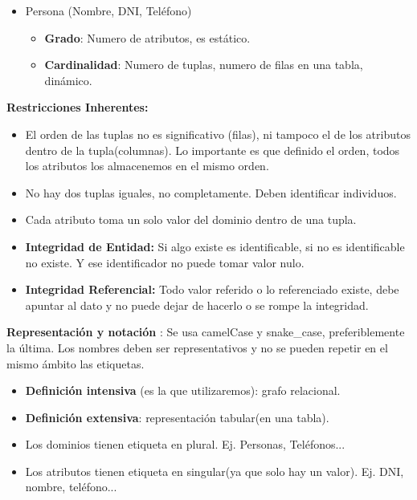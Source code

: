 \documentclass[12pt, twoside, openright]{report} %
\begin{document}
  \begin{itemize}
  \item Persona (Nombre, DNI, Teléfono)
    

    \begin{itemize}
    \item \textbf{Grado}: Numero de atributos, es estático.
      
    \item \textbf{Cardinalidad}: Numero de tuplas, numero de filas en una
      tabla, dinámico.
      
    \end{itemize}
  \end{itemize}

  
  \textbf{Restricciones Inherentes:}
  

  \begin{itemize}
  \item El orden de las tuplas no es significativo (filas), ni tampoco el de
    los atributos dentro de la tupla(columnas). Lo importante es que
    definido el orden, todos los atributos los almacenemos en el mismo
    orden.
    
  \item No hay dos tuplas iguales, no completamente. Deben identificar
    individuos.
    
  \item Cada atributo toma un solo valor del dominio dentro de una tupla.
    
  \item \textbf{Integridad de Entidad:} Si algo existe es identificable, si
    no es identificable no existe. Y ese identificador no puede tomar
    valor nulo.
    
  \item \textbf{Integridad Referencial:} Todo valor referido o lo
    referenciado existe, debe apuntar al dato y no puede dejar de
    hacerlo o se rompe la integridad.
    
  \end{itemize}

  
  \textbf{Representación y notación} : Se usa camelCase y snake\_case,
  preferiblemente la última. Los nombres deben ser representativos y no
  se pueden repetir en el mismo ámbito las etiquetas.
  

  \begin{itemize}
  \item \textbf{Definición intensiva} (es la que utilizaremos): grafo
    relacional.
    
  \item \textbf{Definición extensiva}: representación tabular(en una tabla).
    
  \item Los dominios tienen etiqueta en plural. Ej. Personas, Teléfonos...
    
  \item Los atributos tienen etiqueta en singular(ya que solo hay un valor).
    Ej. DNI, nombre, teléfono...
    
  \end{itemize}
\end{document}
